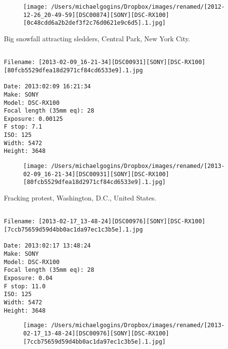 \documentclass[11pt,letter,DIV=14,paper=landscape]{scrbook}
\begin{document}
\begin{figure}
\texttt{[image: /Users/michaelgogins/Dropbox/images/renamed/[2012-12-26\_20-49-59][DSC00874][SONY][DSC-RX100][0c48cdd6a2b2def3f2c76d0621e9c6d5].1.jpg]}
\end{figure}
    
\clearpage
\noindent Big snowfall attracting sledders, Central Park, New York City.
\noindent
\begin{lstlisting}

Filename: [2013-02-09_16-21-34][DSC00931][SONY][DSC-RX100][80fcb5529dfea18d2971cf84cd6533e9].1.jpg

Date: 2013:02:09 16:21:34
Make: SONY
Model: DSC-RX100
Focal length (35mm eq): 28
Exposure: 0.00125
F stop: 7.1
ISO: 125
Width: 5472
Height: 3648
\end{lstlisting}
\clearpage

\begin{figure}
\texttt{[image: /Users/michaelgogins/Dropbox/images/renamed/[2013-02-09\_16-21-34][DSC00931][SONY][DSC-RX100][80fcb5529dfea18d2971cf84cd6533e9].1.jpg]}
\end{figure}
    
\clearpage
\noindent Fracking protest, Washington, D.C., United States.
\noindent
\begin{lstlisting}

Filename: [2013-02-17_13-48-24][DSC00976][SONY][DSC-RX100][7ccb75659d59d4bb0ac1da97ec1c3b5e].1.jpg

Date: 2013:02:17 13:48:24
Make: SONY
Model: DSC-RX100
Focal length (35mm eq): 28
Exposure: 0.04
F stop: 11.0
ISO: 125
Width: 5472
Height: 3648
\end{lstlisting}
\clearpage

\begin{figure}
\texttt{[image: /Users/michaelgogins/Dropbox/images/renamed/[2013-02-17\_13-48-24][DSC00976][SONY][DSC-RX100][7ccb75659d59d4bb0ac1da97ec1c3b5e].1.jpg]}
\end{figure}
    
\end{document}
